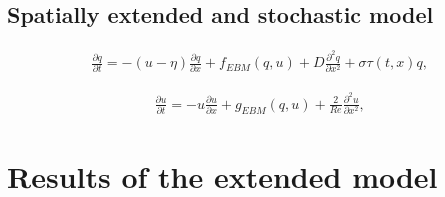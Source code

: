 \documentclass{article}
\begin{document}
\subsection{Spatially extended and stochastic model}
\begin{align}
\frac{\partial q}{\partial t}=-\left(u-\eta \right)\frac{\partial q}{\partial x} + f_{EBM}\left(q,u \right) + D\frac{\partial^{2} q}{\partial x^{2}} + \sigma \tau \left(t,x\right) q \text{,}
\label{eq:SPDE_q}
\end{align}

\begin{align}
\frac{\partial u}{\partial t}=-u\frac{\partial u}{\partial x} + g_{EBM}\left(q,u \right) + \frac{2}{Re}\frac{\partial^{2} u}{\partial x^{2}} \text{,}
\label{eq:PDE_u}
\end{align}










\section{Results of the extended model}
\end{document}
